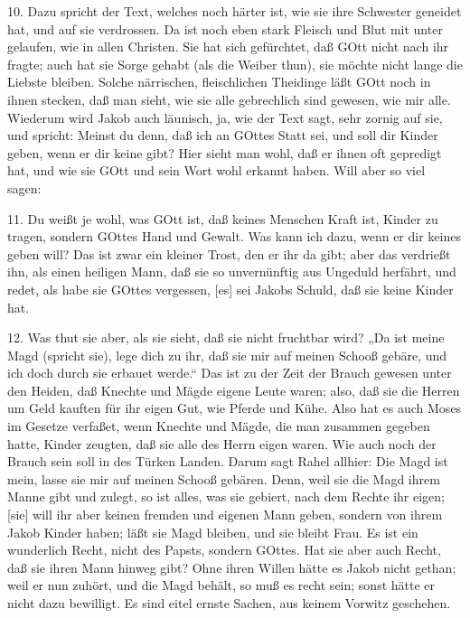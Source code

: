 10. Dazu spricht der Text, welches noch härter ist, wie sie ihre Schwester geneidet hat, und auf sie verdrossen. Da ist noch eben stark Fleisch und Blut mit unter gelaufen, wie in allen Christen. Sie hat sich gefürchtet, daß GOtt nicht nach ihr fragte; auch hat sie Sorge gehabt (als die Weiber thun), sie möchte nicht lange die Liebste bleiben. Solche närrischen, fleischlichen Theidinge läßt GOtt noch in ihnen stecken, daß man sieht, wie sie alle gebrechlich sind gewesen,
wie mir alle. Wiederum wird Jakob auch läunisch, ja, wie der Text sagt, sehr zornig auf sie, und spricht: Meinst du denn, daß ich an GOttes Statt sei, und soll dir Kinder geben, wenn er dir keine gibt? Hier sieht man wohl, daß er ihnen oft gepredigt hat, und wie sie GOtt und sein Wort wohl erkannt haben. Will aber so viel sagen:

11. Du weißt je wohl, was GOtt ist, daß keines Menschen Kraft ist, Kinder zu tragen, sondern GOttes Hand und Gewalt. Was kann ich dazu, wenn er dir keines geben will? Das ist zwar ein kleiner Trost, den er ihr da gibt; aber das verdrießt ihn, als einen heiligen Mann, daß sie so unvernünftig aus Ungeduld herfährt, und redet, als habe sie GOttes vergessen, [es] sei Jakobs Schuld, daß sie keine Kinder hat.

12. Was thut sie aber, als sie sieht, daß sie nicht fruchtbar wird? „Da ist meine Magd (spricht sie), lege dich zu ihr, daß sie mir auf meinen Schooß gebäre, und ich doch durch sie erbauet werde.“ Das ist zu der Zeit der Brauch gewesen unter den Heiden, daß Knechte und Mägde eigene Leute waren; also, daß sie die Herren um Geld kauften für ihr eigen Gut, wie Pferde und Kühe. Also hat es auch Moses im Gesetze verfaßet, wenn Knechte und Mägde, die man zusammen gegeben hatte, Kinder zeugten, daß sie alle des Herrn eigen waren. Wie auch noch der Brauch sein soll in des Türken Landen. Darum sagt Rahel allhier: Die Magd ist mein, lasse sie mir auf meinen Schooß gebären. Denn, weil sie die Magd ihrem Manne gibt und zulegt, so ist alles, was sie gebiert, nach dem Rechte ihr eigen; [sie] will ihr aber keinen fremden und eigenen Mann geben, sondern von ihrem Jakob Kinder haben; läßt sie Magd bleiben, und sie bleibt Frau. Es ist ein wunderlich Recht, nicht des Papsts, sondern GOttes. Hat sie aber auch Recht, daß sie ihren Mann hinweg gibt? Ohne ihren Willen hätte es Jakob nicht gethan; weil er nun zuhört, und die Magd behält, so muß es recht sein; sonst hätte er nicht dazu bewilligt. Es sind eitel ernste Sachen, aus keinem Vorwitz geschehen.

